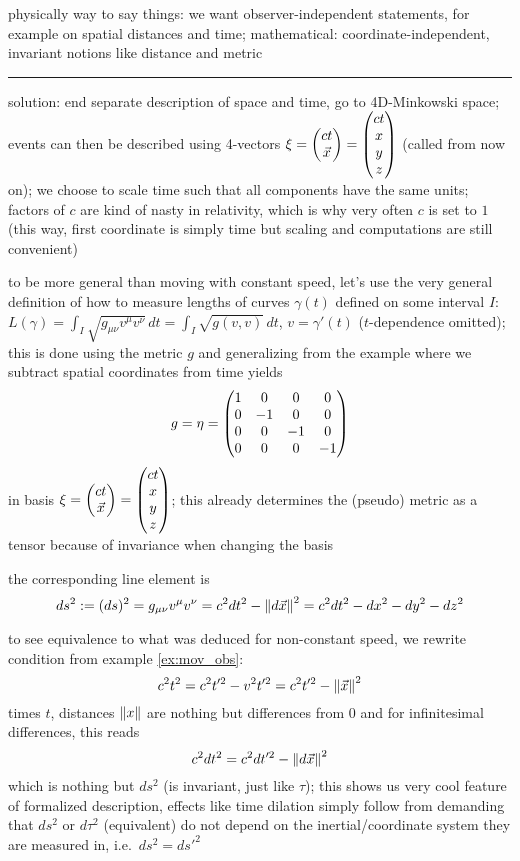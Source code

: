 physically way to say things: we want observer-independent statements, for example on spatial distances and time; mathematical: coordinate-independent, invariant notions like distance and metric


\hrule


solution: end separate description of space and time, go to 4D-Minkowski space; events can then be described using 4-vectors $\mathbf{\xi} = \mqty(c t \\ \vec{x}) = \mqty(c t \\ x \\ y \\ z)$ (called  from now on); we choose to scale time such that all components have the same units; factors of $c$ are kind of nasty in relativity, which is why very often $c$ is set to $1$ (this way, first coordinate is simply time but scaling and computations are still convenient)



to be more general than moving with constant speed, let's use the very general definition of how to measure lengths of curves $\gamma(t)$ defined on some interval $I$: $L(\gamma) = \int_I \sqrt{g_{\mu \nu} v^\mu v^\nu} \, dt = \int_I \sqrt{g(v, v)} \, dt$, $v = \gamma'(t)$ ($t$-dependence omitted); this is done using the metric $g$ and generalizing from the example where we subtract spatial coordinates from time yields
\begin{equation}
g = \eta = \mqty(1 & 0 & 0 & 0 \\ 0 & -1 & 0 & 0 \\ 0 & 0 & -1 & 0 \\ 0 & 0 & 0 & -1)
\end{equation}
in basis $\mathbf{\xi} = \mqty(c t \\ \vec{x}) = \mqty(c t \\ x \\ y \\ z)$; this already determines the (pseudo) metric as a tensor because of invariance when changing the basis

the corresponding line element is
\begin{equation}
ds^2 := (ds)^2 = g_{\mu \nu} v^\mu v^\nu = c^2 dt^2 - \norm{d\vec{x}}^2 = c^2 dt^2 - dx^2 - dy^2 - dz^2
\end{equation}


to see equivalence to what was deduced for non-constant speed, we rewrite condition from example \ref{ex:mov_obs}:
\begin{equation*}
c^2 t^2 = c^2 t'^2 - v^2 t'^2 = c^2 t'^2 - \norm{\vec{x}}^2
\end{equation*}
times $t$, distances $\norm{x}$ are nothing but differences from $0$ and for infinitesimal differences, this reads
\begin{equation*}
c^2 dt^2 = c^2 dt'^2 - \norm{d\vec{x}}^2
\end{equation*}
which is nothing but $ds^2$ (is invariant, just like $\tau$); this shows us very cool feature of formalized description, effects like time dilation simply follow from demanding that $ds^2$ or $d\tau^2$ (equivalent) do not depend on the inertial/coordinate system they are measured in, i.e.~$ds^2 = ds'^2$



